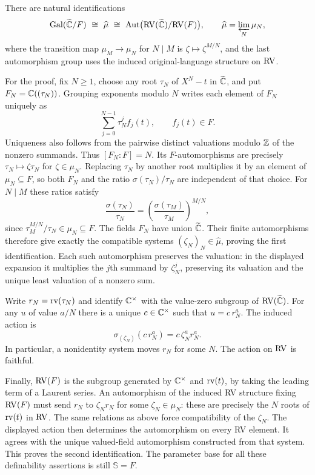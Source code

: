 \begin{rem}\label{puiseux:kummer:action}
There are natural identifications
\[
 \gal(\widetilde{\C}/F)\ \cong\ \widehat{\mu}
 \ \cong\ \aut\bigl(\RV(\widetilde{\C})/\RV(F)\bigr),
 \qquad
 \widehat{\mu}=\varprojlim_N\mu_N,
\]
where the transition map $\mu_M\to\mu_N$ for $N\mid M$
is $\zeta\mapsto\zeta^{M/N}$, and the last automorphism group
uses the induced original-language structure on $\mathrm{RV}$.

For the proof, fix $N\geq1$, choose any root $\tau_N$ of
$X^N-t$ in $\widetilde{\mathbb C}$, and put
$F_N=\mathbb C((\tau_N))$. Grouping exponents modulo $N$ writes each
element of $F_N$ uniquely as
\[
 \sum_{j=0}^{N-1}\tau_N^j f_j(t),\qquad f_j(t)\in F.
\]
Uniqueness also follows from the pairwise distinct valuations
modulo $\mathbb Z$ of the nonzero summands. Thus $[F_N:F]=N$.
Its $F$-automorphisms are precisely
$\tau_N\mapsto\zeta\tau_N$ for $\zeta\in\mu_N$.
Replacing $\tau_N$ by another root multiplies it by an element
of $\mu_N\subseteq F$, so both $F_N$ and the ratio
$\sigma(\tau_N)/\tau_N$ are independent of that choice.
For $N\mid M$ these ratios satisfy
\[
 \frac{\sigma(\tau_N)}{\tau_N}
 =
 \left(\frac{\sigma(\tau_M)}{\tau_M}\right)^{M/N},
\]
since $\tau_M^{M/N}/\tau_N\in\mu_N\subseteq F$.
The fields $F_N$ have union $\widetilde{\mathbb C}$.
Their finite automorphisms therefore give exactly the compatible
systems $(\zeta_N)_N\in\widehat{\mu}$, proving the first
identification. Each such automorphism preserves the valuation:
in the displayed expansion it multiplies the $j$th summand by
$\zeta_N^j$, preserving its valuation and the unique least
valuation of a nonzero sum.

Write $r_N=\operatorname{rv}(\tau_N)$ and identify $\mathbb C^\times$ with the
value-zero subgroup of $\mathrm{RV}(\widetilde{\mathbb C})$.
For any $u$ of value $a/N$ there is a unique $c\in\mathbb C^\times$
such that $u=c\,r_N^a$. The induced action is
\[
 \sigma_{(\zeta_N)}(c\,r_N^a)
   =c\,\zeta_N^a r_N^a .
\]
In particular, a nonidentity system moves $r_N$ for some $N$.
The action on $\mathrm{RV}$ is faithful.

Finally, $\mathrm{RV}(F)$ is the subgroup generated by
$\mathbb C^\times$ and $\operatorname{rv}(t)$, by taking the leading term of a
Laurent series. An automorphism of the induced RV structure
fixing $\mathrm{RV}(F)$ must send $r_N$ to
$\zeta_Nr_N$ for some $\zeta_N\in\mu_N$: these are precisely
the $N$ roots of $\operatorname{rv}(t)$ in $\mathrm{RV}$.
The same relations as above force compatibility of the
$\zeta_N$. The displayed action then determines the
automorphism on every RV element. It agrees with the unique
valued-field automorphism constructed from that system.
This proves the second identification.
The parameter base for all these definability assertions is
still $\mathbb S=F$.
\end{rem}

